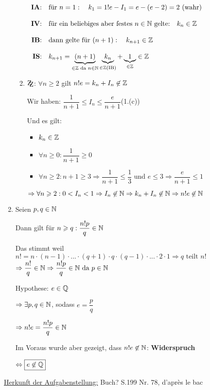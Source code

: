\documentclass[main.tex]{subfiles}
\begin{document}
\begin{Beweis}
\begin{enumerate}
\begin{enumerate}
					$\begin{array}{rl}
						\mbox{\textbf{IA}:} & \mbox{für }n=1:\quad k_1=1!e-I_1=e-(e-2)=2 \mbox{ (wahr)} \\\\
						\mbox{\textbf{IV}:} & \mbox{für ein beliebiges aber festes }n\in\mathbb{N} \mbox{ gelte:}\quad k_n\in\mathbb{Z}\\\\
						\mbox{\textbf{IB}:} & \mbox{dann gelte für }(n+1):\quad k_{n+1}\in\mathbb{Z}\\\\
						\mbox{\textbf{IS}:} & k_{n+1}=\underbrace{(n+1)}_{\in\mathbb{Z}\text{ da }n\in\mathbb{N}}\underbrace{k_n}_{\in\mathbb{Z}\text{(IB)}}+\underbrace{1}_{\in\mathbb{Z}}\in\mathbb{Z}
					\end{array}$
				\item $\zz$: $\forall n\geq 2$ gilt $n!e=k_n+I_n\not\in\mathbb{Z}$

					Wir haben: $\dfrac{1}{n+1}\leq I_n \leq  \dfrac{e}{n+1}$\quad(1.(c))

					Und es gilt:
					\begin{itemize}
						\item$k_n\in\mathbb{Z}$
						\item $\forall n\geq0:\dfrac{1}{n+1}\geq 0$
						\item $\forall n\geq2:n+1\geq3\Rightarrow \dfrac{1}{n+1}\leq \dfrac{1}{3}$ und $e\leq3 \Rightarrow \dfrac{e}{n+1}\leq 1$
					\end{itemize}
					$\Rightarrow\forall n\geqslant2:0<I_n<1\Rightarrow I_n\not\in\mathbb{N}\Rightarrow k_n+I_n\not\in\mathbb{N}\Rightarrow n!e\not\in\mathbb{N}$
			\end{enumerate}
		\item Seien $p, q \in\mathbb{N}$
		
			Dann gilt für $n\geqslant q:\dfrac{n!p}{q}\in\mathbb{N}$
			
			Das stimmt weil $n! = n\cdot(n-1)\cdot...\cdot(q+1)\cdot q\cdot(q-1)\cdot...\cdot2\cdot1\Rightarrow q \text{ teilt }n!$
			$\Rightarrow \dfrac{n!}{q}\in\mathbb{N}\Rightarrow\dfrac{n!p}{q}\in\mathbb{N}\text{ da }p\in\mathbb{N}$
			
			Hypothese: $e\in\mathbb{Q}$
			
			$\Rightarrow \exists p,q \in\mathbb{N}$, sodass $e=\dfrac{p}{q}$

			$\Rightarrow n! e = \dfrac{n!p}{q}\in\mathbb{N}$
			
			Im Voraus wurde aber gezeigt, dass $n!e\not\in\mathbb{N}$: \textbf{Widerspruch}
			
			$\Leftrightarrow \boxed{e\not\in\mathbb{Q}}$
	\end{enumerate}
	\underline{Herkunft der Aufgabenstellung:} Buch? S.199 Nr. 78, d'après le bac
\end{Beweis}
\end{document}
